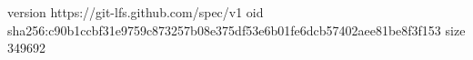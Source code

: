 version https://git-lfs.github.com/spec/v1
oid sha256:c90b1ccbf31e9759c873257b08e375df53e6b01fe6dcb57402aee81be8f3f153
size 349692
